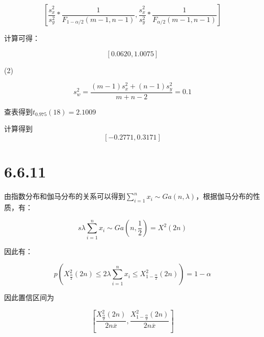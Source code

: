 \documentclass{article}
\begin{document}
$$[\frac{s_x^2}{s_y^2}*\frac{1}{F_{1-\alpha/2}(m-1,n-1)},\frac{s_x^2}{s_y^2}*\frac{1}{F_{\alpha/2}(m-1,n-1)}]$$

计算可得：

$$[0.0620,1.0075]$$

(2)

$$s_w^2=\frac{(m-1)s_x^2+(n-1)s_y^2}{m+n-2}=0.1$$

查表得到$t_{0.975}(18)=2.1009$

计算得到
$$[-0.2771,0.3171]$$

\section{6.6.11}

由指数分布和伽马分布的关系可以得到$\sum^n_{i=1}x_i\sim Ga(n,\lambda)$，根据伽马分布的性质，有：

$$s\lambda\sum^n_{i=1}x_i\sim Ga(n,\frac12)=X^2(2n)$$

因此有：

$$p(X^2_{\frac\alpha2}(2n)\leq2\lambda\sum^n_{i=1}x_i\leq X^2_{1-\frac\alpha2}(2n))=1-\alpha$$

因此置信区间为

$$[\frac{X^2_{\frac\alpha2}(2n)}{2n\overline x},\frac{X^2_{1-\frac\alpha2}(2n)}{2n\overline x}]$$
\end{document}
